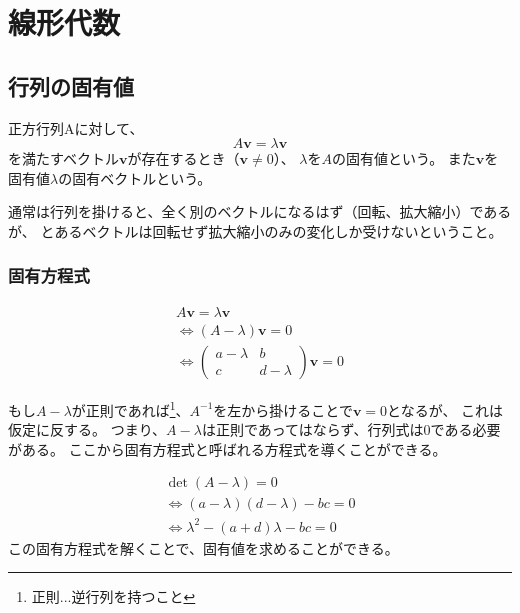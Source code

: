 
\chapter{線形代数}

\section{行列の固有値}

\begin{screen}
  正方行列Aに対して、
  \begin{equation}
    A\bm{v} = \lambda\bm{v}
  \end{equation}
  を満たすベクトル$\bm{v}$が存在するとき（$\bm{v}\neq 0$）、
  $\lambda$を$A$の固有値という。
  また$\bm{v}$を固有値$\lambda$の固有ベクトルという。
\end{screen}

通常は行列を掛けると、全く別のベクトルになるはず（回転、拡大縮小）であるが、
とあるベクトルは回転せず拡大縮小のみの変化しか受けないということ。

\subsection{固有方程式}

\begin{eqnarray*}
  A\bm{v} = \lambda \bm{v} \\ 
  \Leftrightarrow (A-\lambda)\bm{v} = 0  \\
  \Leftrightarrow 
    \left(
      \begin{array}{cc}
        a-\lambda & b  \\
        c & d -\lambda
      \end{array}
    \right)
  \bm{v} = 0
\end{eqnarray*}

もし$A-\lambda$が正則であれば\footnote{正則...逆行列を持つこと}、$A^{-1}$を左から掛けることで$\bm{v}=0$となるが、
これは仮定に反する。
つまり、$A-\lambda$は正則であってはならず、行列式は0である必要がある。
ここから固有方程式と呼ばれる方程式を導くことができる。

\begin{eqnarray*}
  \det (A-\lambda) = 0 \\
  \Leftrightarrow (a-\lambda)(d-\lambda)-bc = 0 \\
  \Leftrightarrow \lambda^2 -(a+d)\lambda -bc = 0 
\end{eqnarray*}
この固有方程式を解くことで、固有値を求めることができる。

